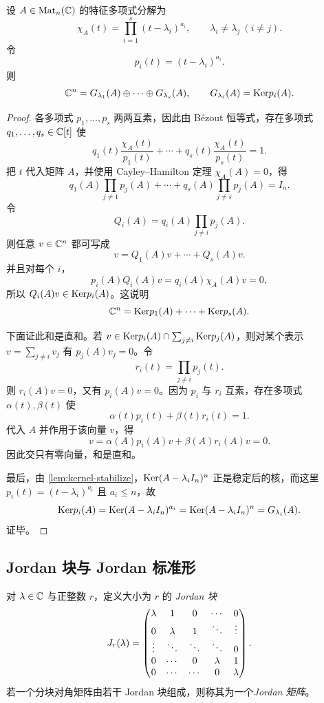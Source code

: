 \begin{theorem}[广义特征子空间分解]\label{thm:primary-decomposition}
设 \(A\in \mathrm{Mat}_n(\mathbb{C})\) 的特征多项式分解为
\[
\chi_A(t)=\prod_{i=1}^s (t-\lambda_i)^{a_i},
\qquad \lambda_i\neq \lambda_j\ (i\neq j).
\]
令
\[
p_i(t)=(t-\lambda_i)^{a_i}.
\]
则
\[
\mathbb{C}^n=G_{\lambda_1}(A)\oplus\cdots\oplus G_{\lambda_s}(A),
\qquad G_{\lambda_i}(A)=\mathrm{Ker} p_i(A).
\]
\end{theorem}

\begin{proof}
各多项式 \(p_1,\dots,p_s\) 两两互素，因此由 Bézout 恒等式，存在多项式 \(q_1,\dots,q_s\in \mathbb{C}[t]\) 使
\[
q_1(t)\frac{\chi_A(t)}{p_1(t)}+\cdots+q_s(t)\frac{\chi_A(t)}{p_s(t)}=1.
\]
把 \(t\) 代入矩阵 \(A\)，并使用 Cayley--Hamilton 定理 \(\chi_A(A)=0\)，得
\[
q_1(A)\prod_{j\ne 1} p_j(A)+\cdots+q_s(A)\prod_{j\ne s} p_j(A)=I_n.
\]
令
\[
Q_i(A)=q_i(A)\prod_{j\ne i}p_j(A).
\]
则任意 \(v\in \mathbb{C}^n\) 都可写成
\[
v=Q_1(A)v+\cdots+Q_s(A)v.
\]
并且对每个 \(i\)，
\[
p_i(A)Q_i(A)v=q_i(A)\chi_A(A)v=0,
\]
所以 \(Q_i(A)v\in \mathrm{Ker} p_i(A)\)。这说明
\[
\mathbb{C}^n=\mathrm{Ker} p_1(A)+\cdots+\mathrm{Ker} p_s(A).
\]

下面证此和是直和。若 \(v\in \mathrm{Ker} p_i(A)\cap \sum_{j\ne i}\mathrm{Ker} p_j(A)\)，则对某个表示 \(v=\sum_{j\ne i}v_j\) 有 \(p_j(A)v_j=0\)。令
\[
r_i(t)=\prod_{j\ne i} p_j(t).
\]
则 \(r_i(A)v=0\)，又有 \(p_i(A)v=0\)。因为 \(p_i\) 与 \(r_i\) 互素，存在多项式 \(\alpha(t),\beta(t)\) 使
\[
\alpha(t)p_i(t)+\beta(t)r_i(t)=1.
\]
代入 \(A\) 并作用于该向量 \(v\)，得
\[
v=\alpha(A)p_i(A)v+\beta(A)r_i(A)v=0.
\]
因此交只有零向量，和是直和。

最后，由 \cref{lem:kernel-stabilize}，\(\mathrm{Ker}(A-\lambda_i I_n)^n\) 正是稳定后的核，而这里 \(p_i(t)=(t-\lambda_i)^{a_i}\) 且 \(a_i\le n\)，故
\[
\mathrm{Ker} p_i(A)=\mathrm{Ker}(A-\lambda_i I_n)^{a_i}=\mathrm{Ker}(A-\lambda_i I_n)^n=G_{\lambda_i}(A).
\]
证毕。
\end{proof}

\subsection{Jordan 块与 Jordan 标准形}

\begin{definition}
对 \(\lambda\in \mathbb{C}\) 与正整数 \(r\)，定义大小为 \(r\) 的 \emph{Jordan 块}
\[
J_r(\lambda)=
\begin{pmatrix} 
\lambda&1&0&\cdots&0\\
0&\lambda&1&\ddots&\vdots\\
\vdots&\ddots&\ddots&\ddots&0\\
0&\cdots&0&\lambda&1\\
0&\cdots&\cdots&0&\lambda  \end{pmatrix}.
\]
若一个分块对角矩阵由若干 Jordan 块组成，则称其为一个\emph{Jordan 矩阵}。
\end{definition}

